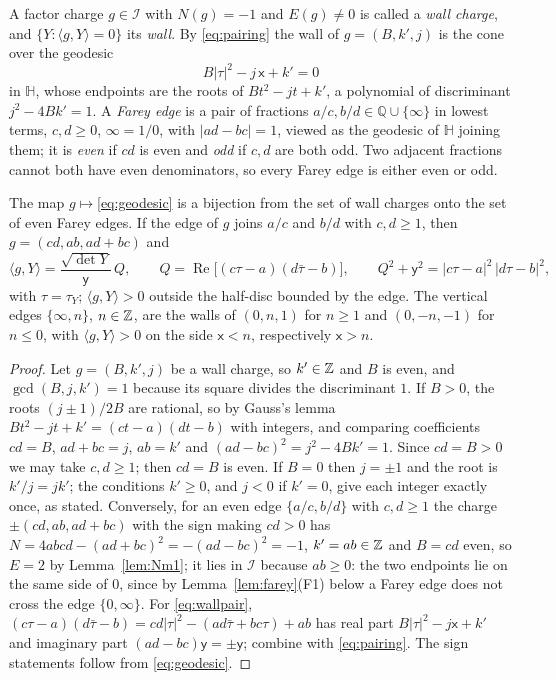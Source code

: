 A factor charge $g\in\mathcal I$ with $N(g)=-1$ and $E(g)\ne0$ is called a \emph{wall charge}, and $\{Y:\langle g,Y\rangle=0\}$ its \emph{wall}. By \eqref{eq:pairing} the wall of $g=(B,k',j)$ is the cone over the geodesic
\begin{equation}\label{eq:geodesic}
B|\tau|^2-j\,\mathsf x+k'=0
\end{equation}
in $\mathbb H$, whose endpoints are the roots of $Bt^2-jt+k'$, a polynomial of discriminant $j^2-4Bk'=1$. A \emph{Farey edge} is a pair of fractions $a/c,b/d\in\mathbb Q\cup\{\infty\}$ in lowest terms, $c,d\ge0$, $\infty=1/0$, with $|ad-bc|=1$, viewed as the geodesic of $\mathbb H$ joining them; it is \emph{even} if $cd$ is even and \emph{odd} if $c,d$ are both odd. Two adjacent fractions cannot both have even denominators, so every Farey edge is either even or odd.

\begin{lemma}\label{lem:wallsfarey}
The map $g\mapsto$\eqref{eq:geodesic} is a bijection from the set of wall charges onto the set of even Farey edges. If the edge of $g$ joins $a/c$ and $b/d$ with $c,d\ge1$, then $g=(cd,ab,ad+bc)$ and
\begin{equation}\label{eq:wallpair}
\langle g,Y\rangle=\frac{\sqrt{\det Y}}{\mathsf y}\,Q,\qquad Q=\operatorname{Re}\big[(c\tau-a)(d\bar\tau-b)\big],\qquad Q^2+\mathsf y^2=|c\tau-a|^2\,|d\tau-b|^2,
\end{equation}
with $\tau=\tau_Y$; $\langle g,Y\rangle>0$ outside the half-disc bounded by the edge. The vertical edges $\{\infty,n\}$, $n\in\mathbb{Z}$, are the walls of $(0,n,1)$ for $n\ge1$ and $(0,-n,-1)$ for $n\le0$, with $\langle g,Y\rangle>0$ on the side $\mathsf x<n$, respectively $\mathsf x>n$.
\end{lemma}

\begin{proof}
Let $g=(B,k',j)$ be a wall charge, so $k'\in\mathbb{Z}$ and $B$ is even, and $\gcd(B,j,k')=1$ because its square divides the discriminant $1$. If $B>0$, the roots $(j\pm1)/2B$ are rational, so by Gauss's lemma $Bt^2-jt+k'=(ct-a)(dt-b)$ with integers, and comparing coefficients $cd=B$, $ad+bc=j$, $ab=k'$ and $(ad-bc)^2=j^2-4Bk'=1$. Since $cd=B>0$ we may take $c,d\ge1$; then $cd=B$ is even. If $B=0$ then $j=\pm1$ and the root is $k'/j=jk'$; the conditions $k'\ge0$, and $j<0$ if $k'=0$, give each integer exactly once, as stated. Conversely, for an even edge $\{a/c,b/d\}$ with $c,d\ge1$ the charge $\pm(cd,ab,ad+bc)$ with the sign making $cd>0$ has $N=4abcd-(ad+bc)^2=-(ad-bc)^2=-1$, $k'=ab\in\mathbb{Z}$ and $B=cd$ even, so $E=2$ by Lemma~\ref{lem:Nm1}; it lies in $\mathcal I$ because $ab\ge0$: the two endpoints lie on the same side of $0$, since by Lemma~\ref{lem:farey}(F1) below a Farey edge does not cross the edge $\{0,\infty\}$. For \eqref{eq:wallpair}, $(c\tau-a)(d\bar\tau-b)=cd|\tau|^2-(ad\bar\tau+bc\tau)+ab$ has real part $B|\tau|^2-j\mathsf x+k'$ and imaginary part $(ad-bc)\mathsf y=\pm\mathsf y$; combine with \eqref{eq:pairing}. The sign statements follow from \eqref{eq:geodesic}.
\end{proof}

